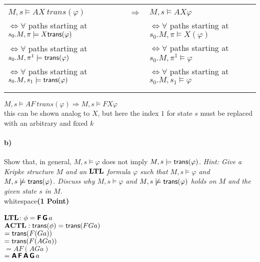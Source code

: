 \begin{tabular}{l l l}
 \hline \\
 \hline \\

$M,s\models AX\ trans(\varphi)$ & $ \Rightarrow $ & $ M,s\models AX \varphi$ \\
$ \Leftrightarrow \forall$ paths starting at $s_0.M, \pi \models X\mathsf{trans}(\varphi)$ & &  $\Leftrightarrow \forall$ paths starting at $s_0.M, \pi \models X(\varphi)$ \\
$ \Leftrightarrow \forall$ paths starting at $s_0.M, \pi^1 \models \mathsf{trans}(\varphi)$ & & $ \Leftrightarrow \forall$ paths starting at $s_0.M, \pi^1 \models \varphi$\\
$ \Leftrightarrow \forall$ paths starting at $s_0.M, s_1 \models \mathsf{trans}(\varphi)$ & & $ \Leftrightarrow \forall$ paths starting at $s_0.M, s_1 \models \varphi$ \\
\hline \\
 \hline \\
\end{tabular}

$M,s\models AF\ trans(\varphi)  \Rightarrow  M,s\models FX \varphi$ \\
this can be shown analog to $X$, but here the index $1$ for state $s$ must be replaced with an arbitrary and fixed $k$


\paragraph{b)} Show that, in general, $M, s \models \varphi$ does not imply $M, s \models \mathsf{trans}(\varphi)$.
\emph{Hint: Give a Kripke structure $M$ and an $\mathbf{LTL}$ formula $\varphi$ such that $M, s \models \varphi$ and $M, s \not\models \mathsf{trans}(\varphi)$. Discuss why $M, s \models \varphi$ and $M, s \not\models \mathsf{trans}(\varphi)$ holds on $M$ and the given state $s$ in $M$.}\\{\color{white} whitespace}\hfill\textbf{(1 Point)}

$\mathbf{LTL}$: $\phi=\textsf{\textbf{F}}\,\textsf{\textbf{G}}\, a$ \\

$\mathbf{ACTL}: \mathsf{trans}(\phi)=\mathsf{trans}(FGa)$ \\
$ = \mathsf{trans}(F(Ga))$ \\
$ = \mathsf{trans}(F(AGa))$ \\
$ = AF(AGa)$ \\
$ = \textsf{\textbf{A}}\,\textsf{\textbf{F}}\,\textsf{\textbf{A}}\,\textsf{\textbf{G}}\, a$ \\

